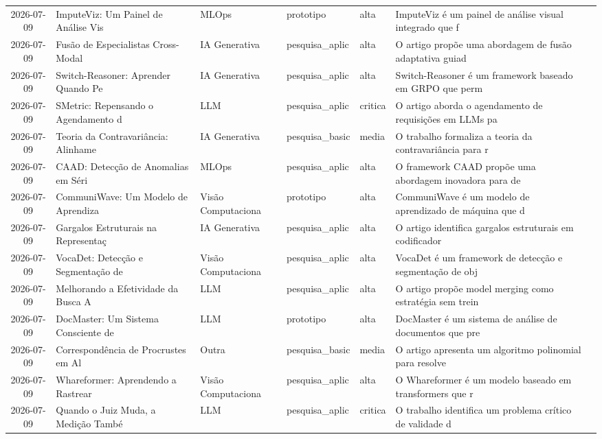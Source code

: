 \documentclass[
  brazilian,
  11pt,
  letterpaper,
  DIV=11,
  numbers=noendperiod]{scrartcl}
\begin{document}
\begin{table}
{\begin{threeparttable}
\begin{tabular}{cp{1.2cm}p{3.5cm}p{2cm}p{1.8cm}p{1.2cm}p{4cm}}
    2026-07-09 & ImputeViz: Um Painel de Análise Vis & MLOps & prototipo & alta & ImputeViz é um painel de análise visual integrado que f \\
    2026-07-09 & Fusão de Especialistas Cross-Modal  & IA Generativa & pesquisa\_aplic & alta & O artigo propõe uma abordagem de fusão adaptativa guiad \\
    2026-07-09 & Switch-Reasoner: Aprender Quando Pe & IA Generativa & pesquisa\_aplic & alta & Switch-Reasoner é um framework baseado em GRPO que perm \\
    2026-07-09 & SMetric: Repensando o Agendamento d & LLM & pesquisa\_aplic & critica & O artigo aborda o agendamento de requisições em LLMs pa \\
    2026-07-09 & Teoria da Contravariância: Alinhame & IA Generativa & pesquisa\_basic & media & O trabalho formaliza a teoria da contravariância para r \\
    2026-07-09 & CAAD: Detecção de Anomalias em Séri & MLOps & pesquisa\_aplic & alta & O framework CAAD propõe uma abordagem inovadora para de \\
    2026-07-09 & CommuniWave: Um Modelo de Aprendiza & Visão Computaciona & prototipo & alta & CommuniWave é um modelo de aprendizado de máquina que d \\
    2026-07-09 & Gargalos Estruturais na Representaç & IA Generativa & pesquisa\_aplic & alta & O artigo identifica gargalos estruturais em codificador \\
    2026-07-09 & VocaDet: Detecção e Segmentação de  & Visão Computaciona & pesquisa\_aplic & alta & VocaDet é um framework de detecção e segmentação de obj \\
    2026-07-09 & Melhorando a Efetividade da Busca A & LLM & pesquisa\_aplic & alta & O artigo propõe model merging como estratégia sem trein \\
    2026-07-09 & DocMaster: Um Sistema Consciente de & LLM & prototipo & alta & DocMaster é um sistema de análise de documentos que pre \\
    2026-07-09 & Correspondência de Procrustes em Al & Outra & pesquisa\_basic & media & O artigo apresenta um algoritmo polinomial para resolve \\
    2026-07-09 & Whareformer: Aprendendo a Rastrear  & Visão Computaciona & pesquisa\_aplic & alta & O Whareformer é um modelo baseado em transformers que r \\
    2026-07-09 & Quando o Juiz Muda, a Medição També & LLM & pesquisa\_aplic & critica & O trabalho identifica um problema crítico de validade d \\

\end{tabular}
\end{threeparttable}}
\end{table}
\end{document}
